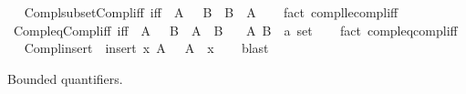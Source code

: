 \begin{isabellebody}
%
\endisadelimproof
\ \isanewline
\isanewline
{}\isamarkupfalse%
\ Compl{\isacharunderscore}{\kern0pt}subset{\isacharunderscore}{\kern0pt}Compl{\isacharunderscore}{\kern0pt}iff\ {\isacharbrackleft}{\kern0pt}iff{\isacharbrackright}{\kern0pt}{\isacharcolon}{\kern0pt}\ {\isachardoublequoteopen}{\isacharminus}{\kern0pt}\ A\ {\isasymsubseteq}\ {\isacharminus}{\kern0pt}\ B\ {\isasymlongleftrightarrow}\ B\ {\isasymsubseteq}\ A{\isachardoublequoteclose}\isanewline
%
\isadelimproof
\ \ %
\endisadelimproof
%
\isatagproof
{}\isamarkupfalse%
\ {\isacharparenleft}{\kern0pt}fact\ compl{\isacharunderscore}{\kern0pt}le{\isacharunderscore}{\kern0pt}compl{\isacharunderscore}{\kern0pt}iff{\isacharparenright}{\kern0pt}%
\endisatagproof
{\isafoldproof}%
%
\isadelimproof
%
\endisadelimproof
\ \isanewline
\isanewline
{}\isamarkupfalse%
\ Compl{\isacharunderscore}{\kern0pt}eq{\isacharunderscore}{\kern0pt}Compl{\isacharunderscore}{\kern0pt}iff\ {\isacharbrackleft}{\kern0pt}iff{\isacharbrackright}{\kern0pt}{\isacharcolon}{\kern0pt}\ {\isachardoublequoteopen}{\isacharminus}{\kern0pt}\ A\ {\isacharequal}{\kern0pt}\ {\isacharminus}{\kern0pt}\ B\ {\isasymlongleftrightarrow}\ A\ {\isacharequal}{\kern0pt}\ B{\isachardoublequoteclose}\isanewline
\ \ \ A\ B\ {\isacharcolon}{\kern0pt}{\isacharcolon}{\kern0pt}\ {\isachardoublequoteopen}{\isacharprime}{\kern0pt}a\ set{\isachardoublequoteclose}\isanewline
%
\isadelimproof
\ \ %
\endisadelimproof
%
\isatagproof
{}\isamarkupfalse%
\ {\isacharparenleft}{\kern0pt}fact\ compl{\isacharunderscore}{\kern0pt}eq{\isacharunderscore}{\kern0pt}compl{\isacharunderscore}{\kern0pt}iff{\isacharparenright}{\kern0pt}%
\endisatagproof
{\isafoldproof}%
%
\isadelimproof
%
\endisadelimproof
\ \isanewline
\isanewline
{}\isamarkupfalse%
\ Compl{\isacharunderscore}{\kern0pt}insert{\isacharcolon}{\kern0pt}\ {\isachardoublequoteopen}{\isacharminus}{\kern0pt}\ insert\ x\ A\ {\isacharequal}{\kern0pt}\ {\isacharparenleft}{\kern0pt}{\isacharminus}{\kern0pt}\ A{\isacharparenright}{\kern0pt}\ {\isacharminus}{\kern0pt}\ {\isacharbraceleft}{\kern0pt}x{\isacharbraceright}{\kern0pt}{\isachardoublequoteclose}\isanewline
%
\isadelimproof
\ \ %
\endisadelimproof
%
\isatagproof
{}\isamarkupfalse%
\ blast%
\endisatagproof
{\isafoldproof}%
%
\isadelimproof
%
\endisadelimproof
%
\begin{isamarkuptext}%
\medskip Bounded quantifiers.


\end{isamarkuptext}
\end{isabellebody}
